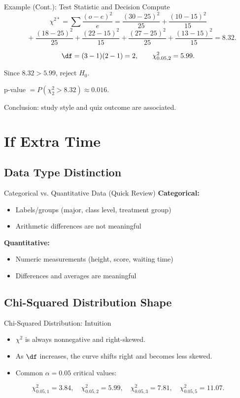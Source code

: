 \documentclass[aspectratio=169]{beamer}
\begin{document}
\begin{frame}{Example (Cont.): Test Statistic and Decision}
  Compute
  \[
    \chi^{2*}=\sum\frac{(o-e)^2}{e}
    =\frac{(30-25)^2}{25}+\frac{(10-15)^2}{15}
  \]
  \[
    \quad+\frac{(18-25)^2}{25}+\frac{(22-15)^2}{15}
    +\frac{(27-25)^2}{25}+\frac{(13-15)^2}{15}
    =8.32.
  \]

  \[
    \df=(3-1)(2-1)=2,
    \qquad
    \chi^2_{0.05,2}=5.99.
  \]

  Since \(8.32>5.99\), reject \(H_0\).

  \vspace{1mm}
  p-value \(=P(\chi^2_2>8.32)\approx0.016\).

  \vspace{1mm}
  Conclusion: study style and quiz outcome are associated.
\end{frame}

\section{If Extra Time}

\subsection{Data Type Distinction}
\begin{frame}{Categorical vs. Quantitative Data (Quick Review)}
  \textbf{Categorical:}
  \begin{itemize}
    \item Labels/groups (major, class level, treatment group)
    \item Arithmetic differences are not meaningful
  \end{itemize}

  \textbf{Quantitative:}
  \begin{itemize}
    \item Numeric measurements (height, score, waiting time)
    \item Differences and averages are meaningful
  \end{itemize}
\end{frame}

\subsection{Chi-Squared Distribution Shape}
\begin{frame}{Chi-Squared Distribution: Intuition}
  \begin{itemize}
    \item \(\chi^2\) is always nonnegative and right-skewed.
    \item As \(\df\) increases, the curve shifts right and becomes less skewed.
    \item Common \(\alpha=0.05\) critical values:
  \end{itemize}

  \[
    \chi^2_{0.05,1}=3.84,\quad
    \chi^2_{0.05,2}=5.99,\quad
    \chi^2_{0.05,3}=7.81,\quad
    \chi^2_{0.05,5}=11.07.
  \]
\end{frame}
\end{document}
